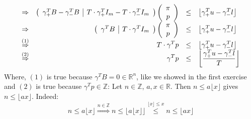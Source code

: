 \documentclass[12pt]{article}
\newenvironment{a_enum}{\begin{enumerate}[label=(\alph{*})]}{\end{enumerate}} %
\begin{document}
\begin{a_enum}
$$\begin{array}{c>{\displaystyle}rc>{\displaystyle}l}
\Rightarrow&\left(\begin{array}{c|c}\gamma_+^TB-\gamma_-^TB&T\cdot\gamma_+^TI_m-T\cdot\gamma_-^TI_m\\\end{array}\right)\left(\begin{array}{c}\pi\\p\\\end{array}\right)&\leq&\left\lfloor\gamma_+^Tu-\gamma_-^Tl\right\rfloor\\
\Rightarrow&\left(\begin{array}{c|c}\gamma^TB&T\cdot\gamma^TI_m\\\end{array}\right)\left(\begin{array}{c}\pi\\p\\\end{array}\right)&\leq&\left\lfloor\gamma_+^Tu-\gamma_-^Tl\right\rfloor\\
\overset{(1)}{\Rightarrow}&T\cdot\gamma^Tp&\leq&\left\lfloor\gamma_+^Tu-\gamma_-^Tl\right\rfloor\\
\overset{(2)}{\Rightarrow}&\gamma^Tp&\leq&\left\lfloor\frac{\gamma_+^Tu-\gamma_-^Tl}{T}\right\rfloor\\
\end{array}$$
Where, $(1)$ is true because $\gamma^TB=0\in\mathbb{R}^n$, like we showed in the first exercise and $(2)$ is true because $\gamma^Tp\in\mathbb{Z}$: Let $n\in\mathbb{Z}$, $a,x\in\mathbb{R}$. Then $n\leq a\lfloor x\rfloor$ gives $n\leq\lfloor ax\rfloor$. Indeed:
$$n\leq a\lfloor x\rfloor\overset{n\in\mathbb{Z}}{\Rightarrow}n\leq\lfloor a\lfloor x\rfloor\rfloor\overset{\lfloor x\rfloor\leq x}{\leq}n\leq\lfloor ax\rfloor$$
\end{a_enum}
\ \\
\end{document}
